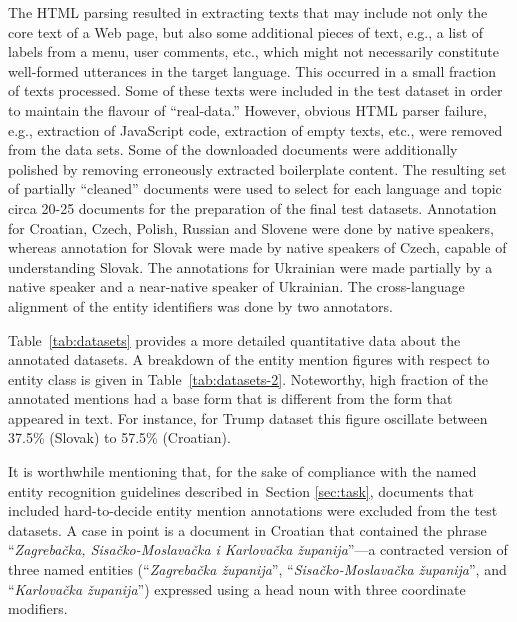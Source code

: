 \documentclass[11pt]{article}
\begin{document}
The HTML parsing resulted in extracting texts that may include not only
the core text of a Web page, but also some additional pieces of text,
e.g., a list of labels from a menu, user comments, etc., which might not
necessarily constitute well-formed utterances in the target language.
This occurred in a small fraction of texts processed.  Some of these
texts were included in the test dataset in order to maintain the flavour
of ``real-data.''  However, obvious HTML parser failure, e.g., extraction
of JavaScript code, extraction of empty texts, etc., were removed from
the data sets.  Some of the downloaded documents were additionally
polished by removing erroneously extracted boilerplate content.  The
resulting set of partially ``cleaned'' documents were used to select for
each language and topic circa 20-25 documents for the preparation of the
final test datasets.  Annotation for Croatian, Czech, Polish, Russian and
Slovene were done by native speakers, whereas annotation for Slovak were made 
by native speakers of Czech, capable of understanding Slovak. The annotations 
for Ukrainian were made partially by a native speaker and a near-native speaker 
of Ukrainian. The cross-language alignment of the entity identifiers was done 
by two annotators.

Table~\ref{tab:datasets} provides a more detailed quantitative data about the annotated datasets. A breakdown 
of the entity mention figures with respect to entity class is given in Table~\ref{tab:datasets-2}. 
Noteworthy, high fraction of the annotated mentions had a base form that is different from
the form that appeared in text. For instance, for {\sc Trump} dataset this figure oscillate 
between 37.5\% (Slovak) to 57.5\% (Croatian).

It is worthwhile mentioning that, for the sake of compliance with the
named entity recognition guidelines described in~Section \ref{sec:task},
documents that included hard-to-decide entity mention annotations were
excluded from the test datasets. {A case in point is a document in
  Croatian that contained the phrase ``\textit{Zagrebačka,
    Sisačko-Moslavačka i Karlovačka županija}''---a contracted version of
  three named entities (``\textit{Zagrebačka županija}'',
  ``\textit{Sisačko-Moslavačka županija}'', and ``\textit{Karlovačka
    županija}'') expressed using a head noun with three coordinate
  modifiers.}
\end{document}
